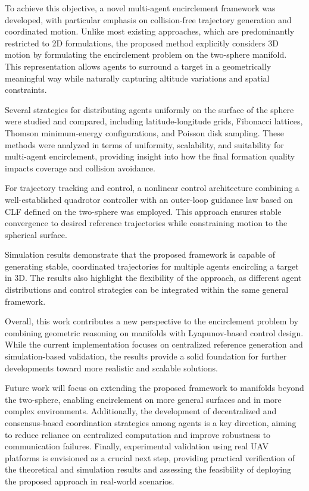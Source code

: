 To achieve this objective, a novel multi-agent encirclement framework was developed, with particular emphasis on collision-free trajectory generation and coordinated motion. Unlike most existing approaches, which are predominantly restricted to \gls{2D} formulations, the proposed method explicitly considers \gls{3D} motion by formulating the encirclement problem on the two-sphere manifold. This representation allows agents to surround a target in a geometrically meaningful way while naturally capturing altitude variations and spatial constraints.

Several strategies for distributing agents uniformly on the surface of the sphere were studied and compared, including latitude-longitude grids, Fibonacci lattices, Thomson minimum-energy configurations, and Poisson disk sampling. These methods were analyzed in terms of uniformity, scalability, and suitability for multi-agent encirclement, providing insight into how the final formation quality impacts coverage and collision avoidance.

For trajectory tracking and control, a nonlinear control architecture combining a well-established quadrotor controller with an outer-loop guidance law based on \gls{CLF} defined on the two-sphere was employed. This approach ensures stable convergence to desired reference trajectories while constraining motion to the spherical surface.

Simulation results demonstrate that the proposed framework is capable of generating stable, coordinated trajectories for multiple agents encircling a target in \gls{3D}. The results also highlight the flexibility of the approach, as different agent distributions and control strategies can be integrated within the same general framework.

Overall, this work contributes a new perspective to the encirclement problem by combining geometric reasoning on manifolds with Lyapunov-based control design. While the current implementation focuses on centralized reference generation and simulation-based validation, the results provide a solid foundation for further developments toward more realistic and scalable solutions.

Future work will focus on extending the proposed framework to manifolds beyond the two-sphere, enabling encirclement on more general surfaces and in more complex environments. Additionally, the development of decentralized and consensus-based coordination strategies among agents is a key direction, aiming to reduce reliance on centralized computation and improve robustness to communication failures. Finally, experimental validation using real UAV platforms is envisioned as a crucial next step, providing practical verification of the theoretical and simulation results and assessing the feasibility of deploying the proposed approach in real-world scenarios.